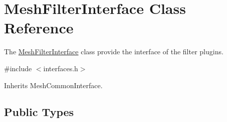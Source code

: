 \hypertarget{class_mesh_filter_interface}{}\section{Mesh\+Filter\+Interface Class Reference}
\label{class_mesh_filter_interface}


The \hyperlink{class_mesh_filter_interface}{Mesh\+Filter\+Interface} class provide the interface of the filter plugins.  




{\ttfamily \#include $<$interfaces.\+h$>$}



Inherits Mesh\+Common\+Interface.

\subsection*{Public Types}
